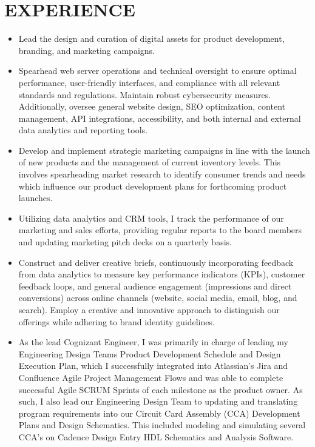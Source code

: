 \documentclass[AutoFakeBold]{resume}
\begin{document}
\section{\makebox[.75em][c]{\faWrench} \textbf{EXPERIENCE}}
\vspace{.5mm}
\begin{itemize}
    \item Lead the design and curation of digital assets for product development, branding, and marketing campaigns.
    \item Spearhead web server operations and technical oversight to ensure optimal performance, user-friendly interfaces, and compliance with all relevant standards and regulations. Maintain robust cybersecurity measures. Additionally, oversee general website design, SEO optimization, content management, API integrations, accessibility, and both internal and external data analytics and reporting tools.
    \item Develop and implement strategic marketing campaigns in line with the launch of new products and the management of current inventory levels. This involves spearheading market research to identify consumer trends and needs which influence our product development plans for forthcoming product launches.
    \item Utilizing data analytics and CRM tools, I track the performance of our marketing and sales efforts, providing regular reports to the board members and updating marketing pitch decks on a quarterly basis.
    \item Construct and deliver creative briefs, continuously incorporating feedback from data analytics to measure key performance indicators (KPIs), customer feedback loops, and general audience engagement (impressions and direct conversions) across online channels (website, social media, email, blog, and search). Employ a creative and innovative approach to distinguish our offerings while adhering to brand identity guidelines.
\end{itemize}
\vspace{.5mm}
\begin{itemize}
    \item As the lead Cognizant Engineer, I was primarily in charge of leading my Engineering Design Teams Product Development Schedule and Design Execution Plan, which I successfully integrated into Atlassian's Jira and Confluence Agile Project Management Flows and was able to complete successful Agile SCRUM Sprints of each milestone as the product owner. As such, I also lead our Engineering Design Team to updating and translating program requirements into our Circuit Card Assembly (CCA) Development Plans and Design Schematics. This included modeling and simulating several CCA's on Cadence Design Entry HDL Schematics and Analysis Software.
\end{itemize}
\end{document}
